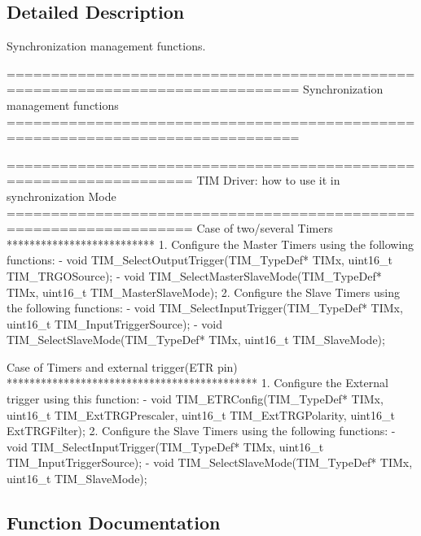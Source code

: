 \subsection{Detailed Description}
Synchronization management functions. 

\begin{DoxyVerb} ===============================================================================
                       Synchronization management functions
 ===============================================================================  
                   
       ===================================================================      
              TIM Driver: how to use it in synchronization Mode
       =================================================================== 
       Case of two/several Timers
       **************************
       1. Configure the Master Timers using the following functions:
          - void TIM_SelectOutputTrigger(TIM_TypeDef* TIMx, uint16_t TIM_TRGOSource); 
          - void TIM_SelectMasterSlaveMode(TIM_TypeDef* TIMx, uint16_t TIM_MasterSlaveMode);  
       2. Configure the Slave Timers using the following functions: 
          - void TIM_SelectInputTrigger(TIM_TypeDef* TIMx, uint16_t TIM_InputTriggerSource);  
          - void TIM_SelectSlaveMode(TIM_TypeDef* TIMx, uint16_t TIM_SlaveMode); 
          
       Case of Timers and external trigger(ETR pin)
       ********************************************       
       1. Configure the External trigger using this function:
          - void TIM_ETRConfig(TIM_TypeDef* TIMx, uint16_t TIM_ExtTRGPrescaler, uint16_t TIM_ExtTRGPolarity,
                               uint16_t ExtTRGFilter);
       2. Configure the Slave Timers using the following functions: 
          - void TIM_SelectInputTrigger(TIM_TypeDef* TIMx, uint16_t TIM_InputTriggerSource);  
          - void TIM_SelectSlaveMode(TIM_TypeDef* TIMx, uint16_t TIM_SlaveMode); \end{DoxyVerb}
 

\subsection{Function Documentation}
\mbox{\label{group___t_i_m___group7_ga8bdde400b7a30f3e747fe8e4962c0abe}} 
